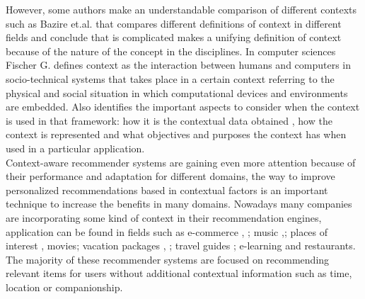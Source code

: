 However, some authors make an understandable comparison of different %
contexts such as Bazire et.al. \cite{bazire2005understanding} that compares 
different definitions of context in different fields and conclude that is
complicated makes a unifying definition of context because of the
nature of the concept in the disciplines. In computer sciences Fischer
G. \cite{fischer2012context} defines context as the interaction
between humans and computers in socio-technical systems that takes
place in a certain context referring to the physical and social
situation in which computational devices and environments are
embedded. %
Also identifies the important aspects to consider when the
context is used in that framework: how it is the contextual data obtained , how
the context is represented and what objectives and purposes the
context has when used in a particular application. \\

Context-aware recommender systems are gaining even more attention
because of their performance and adaptation for different domains, the %
way to improve personalized recommendations based in contextual 
factors is an important technique to increase the benefits in many
domains. %
Nowadays many companies are incorporating some kind of
context in their recommendation engines, application can be found in fields
such as e-commerce \cite{schafer1999recommender}, \cite{bulander2005enabling};
music \cite{ricci2012context},\cite{baltrunas2011incarmusic}; 
places of interest \cite{baltrunas2012context},
movies\cite{eyjolfsdottir2010moviegen}; vacation packages \cite{liu2011personalized},
\cite{liu2014cocktail}; travel guides \cite{savage2012m}; e-learning\cite{ortigosa2010entornos} and restaurants\cite{chu2013chinese}.\\  

The majority of these recommender systems are focused on 
recommending relevant items for users without
additional contextual information such as time, location or %
companionship.  %

